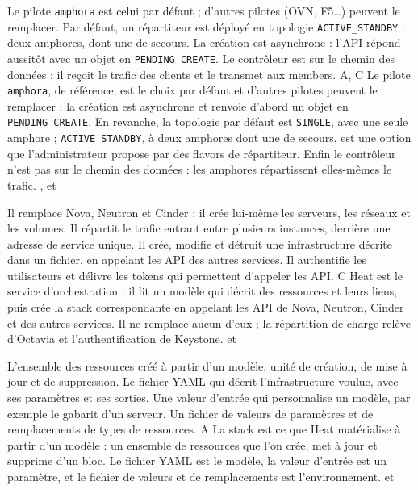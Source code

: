   {Le pilote \texttt{amphora} est celui par défaut ; d'autres pilotes (OVN, F5\dots) peuvent le remplacer.}
  {Par défaut, un répartiteur est déployé en topologie \texttt{ACTIVE\_STANDBY} : deux amphores, dont une de secours.}
  {La création est asynchrone : l'API répond aussitôt avec un objet en \texttt{PENDING\_CREATE}.}
  {Le contrôleur est sur le chemin des données : il reçoit le trafic des clients et le transmet aux members.}
  {A, C}
  {Le pilote \texttt{amphora}, de référence, est le choix par défaut et d'autres pilotes peuvent le remplacer ; la création est asynchrone et renvoie d'abord un objet en \texttt{PENDING\_CREATE}. En revanche, la topologie par défaut est \texttt{SINGLE}, avec une seule amphore ; \texttt{ACTIVE\_STANDBY}, à deux amphores dont une de secours, est une option que l'administrateur propose par des flavors de répartiteur. Enfin le contrôleur n'est pas sur le chemin des données : les amphores répartissent elles-mêmes le trafic.}
  {,  et }


  {Il remplace Nova, Neutron et Cinder : il crée lui-même les serveurs, les réseaux et les volumes.}
  {Il répartit le trafic entrant entre plusieurs instances, derrière une adresse de service unique.}
  {Il crée, modifie et détruit une infrastructure décrite dans un fichier, en appelant les API des autres services.}
  {Il authentifie les utilisateurs et délivre les tokens qui permettent d'appeler les API.}
  {C}
  {Heat est le service d'orchestration : il lit un modèle qui décrit des ressources et leurs liens, puis crée la stack correspondante en appelant les API de Nova, Neutron, Cinder et des autres services. Il ne remplace aucun d'eux ; la répartition de charge relève d'Octavia et l'authentification de Keystone.}
  { et }

  {L'ensemble des ressources créé à partir d'un modèle, unité de création, de mise à jour et de suppression.}
  {Le fichier YAML qui décrit l'infrastructure voulue, avec ses paramètres et ses sorties.}
  {Une valeur d'entrée qui personnalise un modèle, par exemple le gabarit d'un serveur.}
  {Un fichier de valeurs de paramètres et de remplacements de types de ressources.}
  {A}
  {La stack est ce que Heat matérialise à partir d'un modèle : un ensemble de ressources que l'on crée, met à jour et supprime d'un bloc. Le fichier YAML est le modèle, la valeur d'entrée est un paramètre, et le fichier de valeurs et de remplacements est l'environnement.}
  { et }


